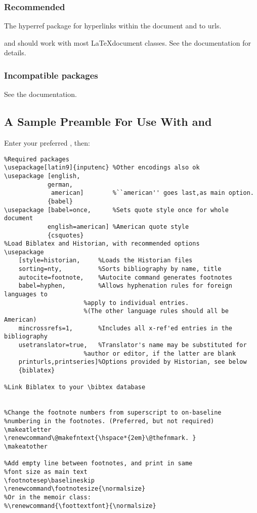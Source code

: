 \documentclass{ltxdockit}[2010/02/12]
\makeatletter
\renewcommand\@makefntext{\hspace*{2em}\@thefnmark. }
\renewcommand\footnotesize{\normalsize}
\makeatother
\begin{document}
\subsubsection{Recommended} 
The hyperref package for hyperlinks within the document and to urls. 

 and  should work with most \LaTeX document classes.
See the  documentation for details. 

\subsubsection{Incompatible packages}
See the  documentation.

\subsection{A Sample Preamble For Use With  and }
Enter your preferred , then:
\begin{verbatim}
%Required packages
\usepackage[latin9]{inputenc} %Other encodings also ok
\usepackage	[english,
           	german,
             american]        %``american'' goes last,as main option.
            {babel} 
\usepackage [babel=once,      %Sets quote style once for whole document
            english=american] %American quote style
            {csquotes}
%Load Biblatex and Historian, with recommended options
\usepackage
	[style=historian,     %Loads the Historian files
	sorting=nty,          %Sorts bibliography by name, title
	autocite=footnote,    %Autocite command generates footnotes
	babel=hyphen,         %Allows hyphenation rules for foreign languages to
                      %apply to individual entries.
                      %(The other language rules should all be American)
	mincrossrefs=1,       %Includes all x-ref'ed entries in the bibliography
	usetranslator=true,   %Translator's name may be substituted for
                      %author or editor, if the latter are blank
	printurls,printseries]%Options provided by Historian, see below
	{biblatex}

%Link Biblatex to your \bibtex database


%Change the footnote numbers from superscript to on-baseline 
%numbering in the footnotes. (Preferred, but not required)
\makeatletter
\renewcommand\@makefntext{\hspace*{2em}\@thefnmark. }
\makeatother

%Add empty line between footnotes, and print in same
%font size as main text
\footnotesep\baselineskip
\renewcommand\footnotesize{\normalsize}
%Or in the memoir class:
%\renewcommand{\foottextfont}{\normalsize}

\end{verbatim}
\end{document}
